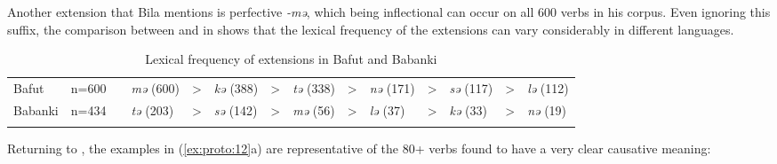 \documentclass[output=paper]{langsci/langscibook}
\begin{document}
\begin{table}[p]
\caption{Bafut verb extensions}
\label{extab:proto:10}
\end{table}

\clearpage 



     
Another extension that Bila mentions is perfective \textit{-mə}, which being inflectional can occur on all 600 verbs in his corpus. Even ignoring this suffix, the comparison between  and  in  shows that the lexical frequency of the extensions can vary considerably in different languages.

\begin{table}
\begin{tabularx}{\textwidth}{ll p{0mm} Q p{1mm} Q p{1mm} Q p{1mm} Q p{1mm} Q p{1mm} Q}
\lsptoprule
Bafut & n=600 &  & \textit{mə }(600) & > & \textit{kə} (388) & > & \textit{tə} (338) & > & \textit{nə} (171) & > & \textit{sə} (117) & > & \textit{lə} (112)\\
\tablevspace
Babanki & n=434 &  & \textit{tə }(203) & > & \textit{sə} (142) & > & \textit{mə} (56) & > & \textit{lə} (37) & > & \textit{kə} (33) & > & \textit{nə} (19)\\
\lspbottomrule
\end{tabularx}
\caption{Lexical frequency of extensions in Bafut and Babanki}
\label{extab:proto:11}
\end{table}

Returning to , the examples in (\ref{ex:proto:12}a) are representative of the 80+ verbs found to have a very clear causative meaning:

\newcommand{\fourbox}[4]{\parbox{2cm}{#1}\parbox{3cm}{#2}\parbox{2cm}{#3}\parbox{3cm}{#4}}
\newlength{\boxone}
\newlength{\boxtwo}
\newlength{\boxthree}
\newlength{\boxfour}
\setlength{\boxone}{2cm}
\setlength{\boxtwo}{2cm}
\setlength{\boxthree}{2cm}
\setlength{\boxfour}{2cm}
\end{document}
